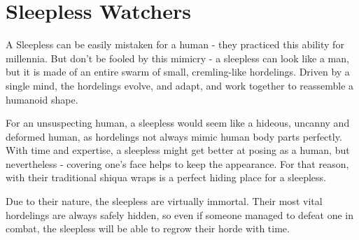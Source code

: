\section{Sleepless Watchers}
\label{enemyFractionSleepless}

A Sleepless can be easily mistaken for a human - they practiced this ability for millennia. But don't be fooled by this mimicry - a sleepless can look like a man, but it is made of an entire swarm of small, cremling-like hordelings. Driven by a single mind, the hordelings evolve, and adapt, and work together to reassemble a humanoid shape.

For an unsuspecting human, a sleepless would seem like a hideous, uncanny and deformed human, as hordelings not always mimic human body parts perfectly. With time and expertise, a sleepless might get better at posing as a human, but nevertheless - covering one's face helps to keep the appearance. For that reason, \locationYeddaw{} with their traditional shiqua wraps is a perfect hiding place for a sleepless.

Due to their nature, the sleepless are virtually immortal. Their most vital hordelings are always safely hidden, so even if someone managed to defeat one in combat, the sleepless will be able to regrow their horde with time. \\




\newpage

\newpage

\newpage

